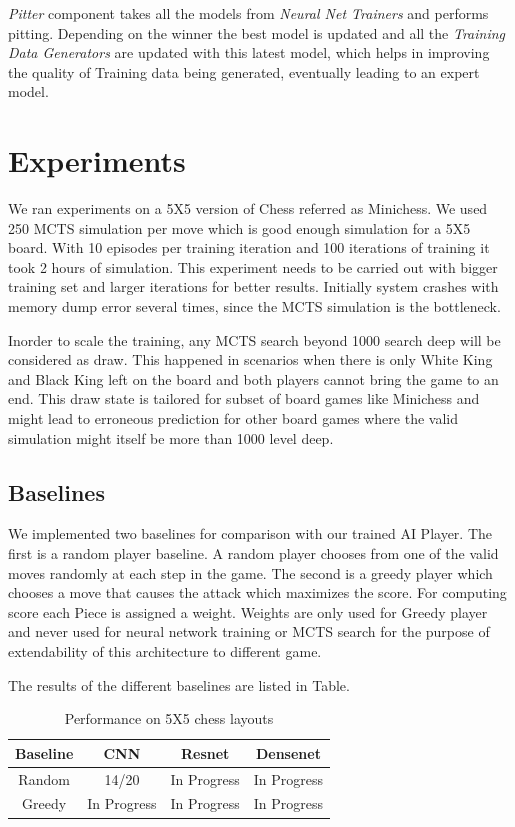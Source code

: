 \documentclass[11pt]{article}
\begin{document}
{\em Pitter} component takes all the models from {\em Neural Net Trainers} and performs pitting. Depending on the winner the best model is updated and all the {\em Training Data Generators} are updated with this latest model, which helps in improving the quality of Training data being generated, eventually leading to an expert model.


\section{Experiments}

We ran experiments on a 5X5 version of Chess referred as Minichess. We used 250 MCTS simulation per move which is good enough simulation for a 5X5 board. With 10 episodes per training iteration and 100 iterations of training it took 2 hours of simulation. This experiment needs to be carried out with bigger training set and larger iterations for better results. Initially system crashes with memory dump error several times, since the MCTS simulation is the bottleneck. 

Inorder to scale the training, any MCTS search beyond 1000 search deep will be considered as draw. This happened in scenarios when there is only White King and Black King left on the board and both players cannot bring the game to an end. This draw state is tailored for subset of board games like Minichess and might lead to erroneous prediction for other board games where the valid simulation might itself be more than 1000 level deep.

\subsection{Baselines}

We implemented two baselines for comparison with our trained AI Player. The first is a random player baseline. A random player chooses from one of the valid moves randomly at each step in the game. The second is a greedy player which chooses a move that causes the attack which maximizes the score. For computing score each Piece is assigned a weight. Weights are only used for Greedy player and never used for neural network training or MCTS search for the purpose of extendability of this architecture to different game.

The results of the different baselines are listed in Table.

\begin{table}[h]
\begin{center}
\begin{tabular}{c c c c}
\hline \bf Baseline & \bf CNN & \bf Resnet  & \bf Densenet   \\ \hline
Random & 14/20 & In Progress & In Progress  \\
Greedy & In Progress & In Progress & In Progress \\

\hline
\end{tabular}
\end{center}
\caption{\label{font-table} Performance on 5X5 chess layouts }
\end{table}
\end{document}
